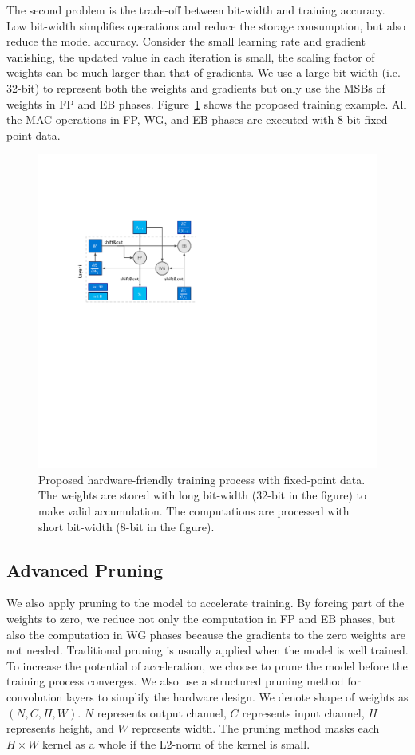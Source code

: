 The second problem is the trade-off between bit-width and training accuracy. Low bit-width simplifies operations and reduce the storage consumption, but also reduce the model accuracy. Consider the small learning rate and gradient vanishing, the updated value in each iteration is small, the scaling factor of weights can be much larger than that of gradients. We use a large bit-width (i.e. 32-bit) to represent both the weights and gradients but only use the MSBs of weights in FP and EB phases. Figure~\ref{fig:fixed_train} shows the proposed training example. All the MAC operations in FP, WG, and EB phases are executed with 8-bit fixed point data.  

\begin{figure}[tb]
  \centering 
  \includegraphics[width=0.9\columnwidth]{figures/fixed_train.pdf}
  \caption{Proposed hardware-friendly training process with fixed-point data. The weights are stored with long bit-width (32-bit in the figure) to make valid accumulation. The computations are processed with short bit-width (8-bit in the figure).}
  \label{fig:fixed_train}
\end{figure}

\subsection{Advanced Pruning}

We also apply pruning to the model to accelerate training. By forcing part of the weights to zero, we reduce not only the computation in FP and EB phases, but also the computation in WG phases because the gradients to the zero weights are not needed. Traditional pruning is usually applied when the model is well trained. To increase the potential of acceleration, we choose to prune the model before the training process converges. We also use a structured pruning method for convolution layers to simplify the hardware design. We denote shape of weights as $(N, C, H, W)$. $N$ represents output channel, $C$ represents input channel, $H$ represents height, and $W$ represents width. The pruning method masks each $H\times W$ kernel as a whole if the L2-norm of the kernel is small. 

